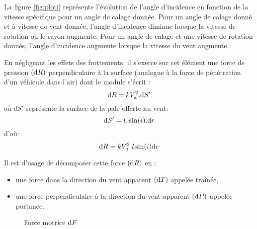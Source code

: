 \documentclass[main.tex]{subfiles}
\begin{document}
La figure \ref{fig:ploti} représente l'évolution de l'angle d'incidence en fonction de la vitesse spécifique pour un angle de calage donnée. Pour un angle de calage donné et à vitesse de vent donnée, l’angle d’incidence diminue lorsque la vitesse de rotation ou le rayon augmente. Pour un angle de calage et une vitesse de rotation donnés, l’angle d’incidence augmente lorsque la vitesse du vent augmente.
\begin{prop}
En négligeant les effets des frottements, il s’exerce sur cet élément une force de pression $(\mbox{d} R)$ perpendiculaire à la surface (analogue à la force de pénétration d’un véhicule dans l'air) dont le module s’écrit :
\[
  \mbox{d} R = kV_a^2.\mbox{d} S'
\]
où $dS'$ représente la surface de la pale offerte au vent:
\[
  \mbox{d} S' = l.\sin(i).\mbox{d} r
\]
d'où:
\[
  \mbox{d} R = kV_a^2.l\sin(i)\mbox{d} r
\]
\end{prop}
Il est d’usage de décomposer cette force $(\mbox{d} R)$ en :

\begin{itemize}
\item  une force dans la direction du vent apparent $(\mbox{d} T)$ appelée traînée,
\item  une force perpendiculaire à la direction du vent apparent $(\mbox{d} P)$ appelée portance.
\end{itemize}

\begin{figure}[H]
  \centering
  \caption{Force motrice $\mbox{d} F$}
\end{figure}
\end{document}
